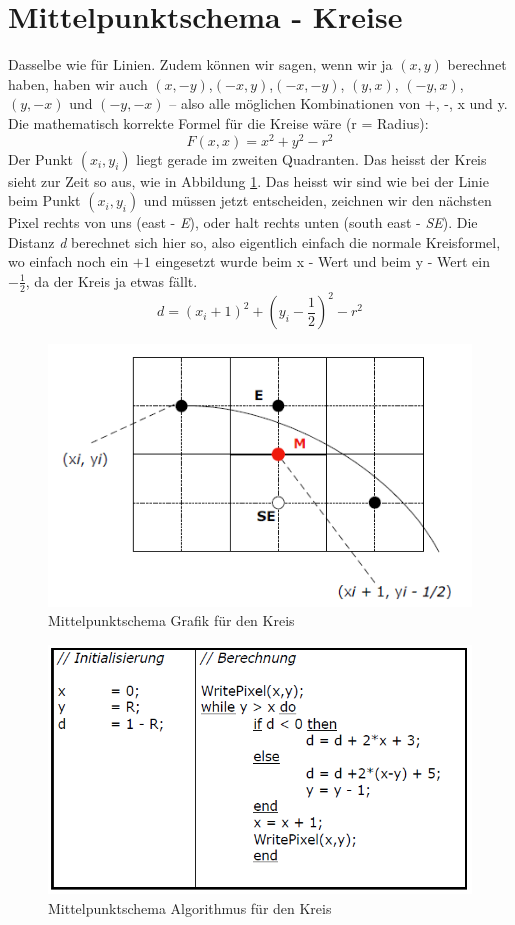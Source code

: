 \section{Mittelpunktschema - Kreise}
Dasselbe wie für Linien. Zudem können wir sagen, wenn wir ja \((x,y)\) berechnet haben, haben wir auch \((x,-y)\),\((-x,y)\),\((-x,-y)\), \((y,x)\), \((-y,x)\), \((y,-x)\) und \((-y,-x)\) -- also alle möglichen Kombinationen von +, -, x und y. Die mathematisch korrekte Formel für die Kreise wäre (r = Radius):
\begin{displaymath}
F(x,x) = x^2 + y^2 - r^2
\end{displaymath}
Der Punkt \((x_i,y_i)\) liegt gerade im zweiten Quadranten. Das heisst der Kreis sieht zur Zeit so aus, wie in Abbildung \ref{fig:mittelpunktschema_kreis}. Das heisst wir sind wie bei der Linie beim Punkt \((x_i,y_i)\) und müssen jetzt entscheiden, zeichnen wir den nächsten Pixel rechts von uns (east - \textit{E}), oder halt rechts unten (south east - \textit{SE}). Die Distanz \textit{d} berechnet sich hier so, also eigentlich einfach die normale Kreisformel, wo einfach noch ein \(+1\) eingesetzt wurde beim x - Wert und beim y - Wert ein \(- \frac{1}{2}\), da der Kreis ja etwas fällt.
\begin{displaymath}
d = (x_i + 1)^2 + (y_i - \frac{1}{2})^2 - r^2
\end{displaymath}
\begin{figure}[!ht]
	\centering
	\includegraphics[width=0.4\linewidth]{fig/mittelpunktschema_kreis}
	\caption{Mittelpunktschema Grafik für den Kreis}
	\label{fig:mittelpunktschema_kreis}
\end{figure}

\begin{figure}[!ht]
	\centering
	\includegraphics[width=0.4\linewidth]{fig/mittelpunktschema_algo_kreis}
	\caption{Mittelpunktschema Algorithmus für den Kreis}
	\label{mittelpunktschema_algo_kreis}
\end{figure}

